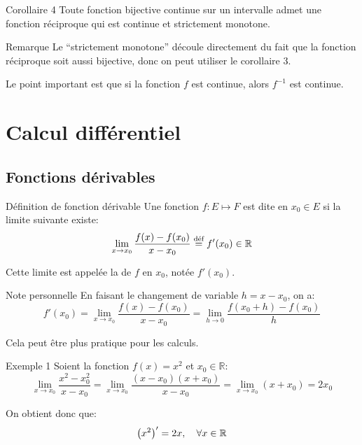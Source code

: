 \documentclass[a4paper]{article}
\begin{document}
\begin{parag}{Corollaire 4}
    Toute fonction bijective continue sur un intervalle admet une fonction réciproque qui est continue et strictement monotone.

    \begin{subparag}{Remarque}
        Le ``strictement monotone'' découle directement du fait que la fonction réciproque soit aussi bijective, donc on peut utiliser le corollaire 3.

        Le point important est que si la fonction $f$ est continue, alors $f^{-1}$ est continue.
    \end{subparag}
\end{parag}

\section{Calcul différentiel}
\subsection{Fonctions dérivables}
\begin{parag}{Définition de fonction dérivable}
    Une fonction $f: E \mapsto F$ est dite  en $x_0 \in E$ si la limite suivante existe:
    \[\lim_{x \to x_0} \frac{f\left(x\right) - f\left(x_0\right)}{x - x_0} \over{=}{déf} f'\left(x_0\right) \in \mathbb{R}\]

    Cette limite est appelée la  de $f$ en $x_0$, notée $f'\left(x_0\right)$.


    \begin{subparag}{Note personnelle}
        En faisant le changement de variable $h = x - x_0$, on a:
        \[f'\left(x_0\right) = \lim_{x \to x_0} \frac{f\left(x\right) - f\left(x_0\right)}{x - x_0} = \lim_{h \to 0} \frac{f\left(x_0 + h\right) - f\left(x_0\right)}{h}\]

        Cela peut être plus pratique pour les calculs.
    \end{subparag}

\end{parag}

\begin{parag}{Exemple 1}
    Soient la fonction $f\left(x\right) = x^2$ et $x_0 \in \mathbb{R}$:
    \[\lim_{x \to x_0} \frac{x^2 - x_0^2}{x - x_0} = \lim_{x \to x_0} \frac{\left(x - x_0\right)\left(x + x_0\right)}{x - x_0} = \lim_{x \to x_0} \left(x + x_0\right) = 2x_0\]

    On obtient donc que:
    \[\left(x^2\right)' = 2x, \mathspace \forall x \in \mathbb{R}\]
\end{parag}
\end{document}
